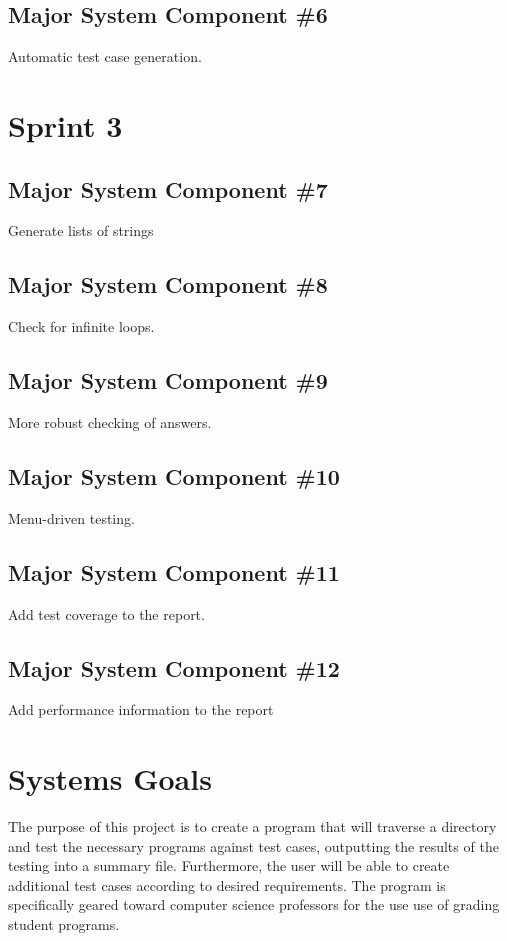 \subsection{Major System Component \#6}
Automatic test case generation.

\section{Sprint 3}

\subsection{Major System Component \#7}
Generate lists of strings

\subsection{Major System Component \#8}
Check for infinite loops.

\subsection{Major System Component \#9}
More robust checking of answers.

\subsection{Major System Component \#10}
Menu-driven testing.

\subsection{Major System Component \#11}
Add test coverage to the report.

\subsection{Major System Component \#12}
Add performance information to the report

\section{Systems Goals}The purpose of this project is to create a program that will traverse a directory and test the necessary programs against test cases, outputting the results of the testing into a summary file.  Furthermore, the user will be able to create additional test cases according to desired requirements. The program is specifically geared toward computer science professors for the use use of grading student programs. 

